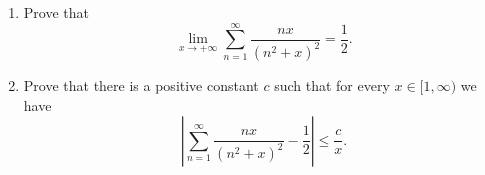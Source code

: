 \documentclass{article}
\begin{document}
	\setlength{\parindent}{0pt}
	\begin{enumerate}[label=(\roman*)]
		\item Prove that
		$$\lim_{x\to+\infty}\sum_{n=1}^{\infty}\frac{nx}{(n^2+x)^2}=\frac{1}{2}.$$
		\item Prove that there is a positive constant $c$ such that for every $x\in[1,\infty)$ we have
		$$\left\lvert\sum_{n=1}^{\infty}\frac{nx}{(n^2+x)^2}-\frac{1}{2}\right\rvert\leq\frac{c}{x}.$$
	\end{enumerate}
\end{document}
